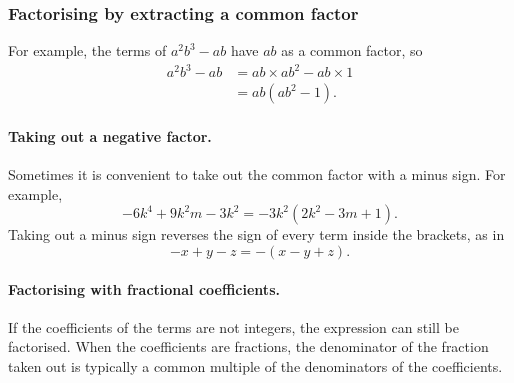 \subsubsection{Factorising by extracting a common factor}


For example, the terms of $a^{2}b^{3} - ab$ have $ab$ as a common factor, so
\begin{align*}
  a^{2}b^{3} - ab &= ab \times ab^{2} - ab \times 1 \\
                  &= ab(ab^{2} - 1).
\end{align*}


\paragraph{Taking out a negative factor.}
Sometimes it is convenient to take out the common factor with a minus sign. For example,
\[ -6k^{4} + 9k^{2}m - 3k^{2} = -3k^{2}(2k^{2} - 3m + 1). \]
Taking out a minus sign reverses the sign of every term inside the brackets, as in
\[ -x + y - z = -(x - y + z). \]

\paragraph{Factorising with fractional coefficients.}
If the coefficients of the terms are not integers, the expression can still be factorised. When the coefficients are fractions, the denominator of the fraction taken out is typically a common multiple of the denominators of the coefficients.


